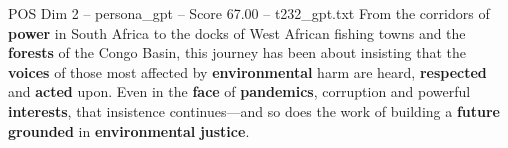 \begin{textsample}{POS Dim 2 – persona\_gpt – Score 67.00 – t232\_gpt.txt}
From the corridors of \textbf{power} in South Africa to the docks of West African fishing towns and the \textbf{forests} of the Congo Basin, this journey has been about insisting that the \textbf{voices} of those most affected by \textbf{environmental} harm are heard, \textbf{respected} and \textbf{acted} upon.
Even in the \textbf{face} of \textbf{pandemics}, corruption and powerful \textbf{interests}, that insistence continues—and so does the work of building a \textbf{future} \textbf{grounded} in \textbf{environmental} \textbf{justice}.

\end{textsample}
